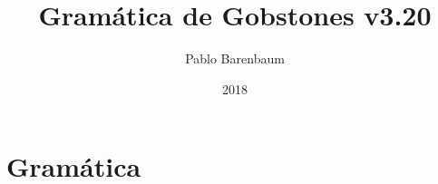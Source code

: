 \documentclass{article}
\begin{document}
\newcommand{\chr}[1]{\texttt{'}\textcolor{blue}{\texttt{#1}}\texttt{'}}
\newcommand{\str}[1]{\texttt{"}\textcolor{blue}{\texttt{#1}}\texttt{"}}
\newcommand{\token}[1]{\textcolor{red}{\texttt{#1}}}
\newcommand{\nonterminal}[1]{\textcolor{blue}{{\it$\langle$#1$\rangle$}}}
\newcommand{\nonEmpty}[1]{#1$_{1}$}
\newcommand{\production}[2]{
  \noindent
  \begin{tabular}{lrp{10cm}}
  #1 & $\xrightarrow{\hspace{.5cm}}$ & #2
  \end{tabular}\\
}
\newcommand{\EMPTY}{$\epsilon$}
\newcommand{\ALT}{
  \\ & $\mid$ &
}
\newcommand{\ALTA}{
  $\mid$
}
\newcommand{\TODO}[1]{\textcolor{red}{****#1****}}

\newcommand{\type}[1]{\textcolor{blue}{\texttt{#1}}}
\renewcommand{\ast}[1]{\textcolor{darkgreen}{\texttt{\underline{#1}}}}
\newcommand{\instruction}[1]{\textcolor{darkgreen}{\texttt{\underline{#1}}}}
\newcommand{\typedecl}[2]{\noindent
  \begin{tabularx}{\textwidth}{lrlr}
  #1 & $=$ & #2
  \end{tabularx}\\
}
\newcommand{\datadecl}[2]{\noindent
  \begin{tabularx}{\textwidth}{lrp{13cm}r}
  #1 & $::=$ & #2
  \end{tabularx}\\
}

\newcommand{\PUEDE}{{\bf PUEDE}\xspace}
\newcommand{\PUEDEN}{{\bf PUEDEN}\xspace}
\newcommand{\NOPUEDE}{{\bf NO PUEDE}\xspace}
\newcommand{\NOPUEDEN}{{\bf NO PUEDEN}\xspace}
\newcommand{\DEBE}{{\bf DEBE}\xspace}
\newcommand{\DEBEN}{{\bf DEBEN}\xspace}

\newcommand{\typename}[1]{\textcolor{blue}{\texttt{#1}}}
\newcommand{\constructorname}[1]{\textcolor{red}{\texttt{#1}}}
\newcommand{\fieldname}[1]{\textcolor{darkgreen}{\textit{#1}}}

\title{Gramática de Gobstones v3.20}
\author{Pablo Barenbaum}
\date{2018}

\maketitle

\tableofcontents

\section{Gram\'atica}
\end{document}
